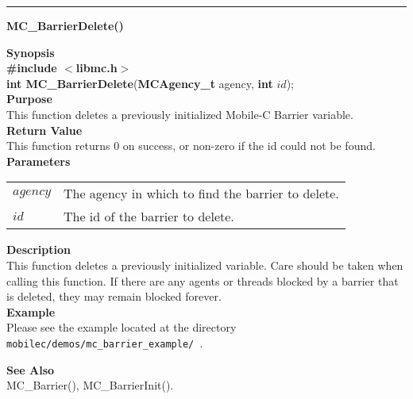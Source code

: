 \noindent
\vspace{5pt}
\rule{6.5in}{0.015in}
\noindent
{}
{\LARGE \bf MC\_BarrierDelete()}\\
\label{api:MC_BarrierDelete()}

\noindent
{\bf Synopsis}\\
{\bf \#include $<$libmc.h$>$}\\
{\bf int MC\_BarrierDelete}({\bf MCAgency\_t} agency, {\bf int} $id$);\\

\noindent
{\bf Purpose}\\
This function deletes a previously initialized Mobile-C Barrier variable.
 \\

\noindent
{\bf Return Value}\\
This function returns 0 on success, or non-zero if the id could not be found. \\

\noindent
{\bf Parameters}
\vspace{-0.1pt}
\begin{description}
\item
\begin{tabular}{p{10 mm}p{145 mm}} 
$agency$ & The agency in which to find the barrier to delete.\\
$id$ & The id of the barrier to delete. 
\end{tabular}
\end{description}

\noindent
{\bf Description}\\
This function deletes a previously initialized variable. Care should be taken
when calling this function. If there are any agents or threads blocked
by a barrier that is deleted, they may remain blocked forever.
    \\

\noindent
{\bf Example}\\
Please see the example located at the directory
\texttt{ mobilec/demos/mc\_barrier\_example/ }. \\

\noindent

\noindent
{\bf See Also}\\
MC\_Barrier(), MC\_BarrierInit(). \\

